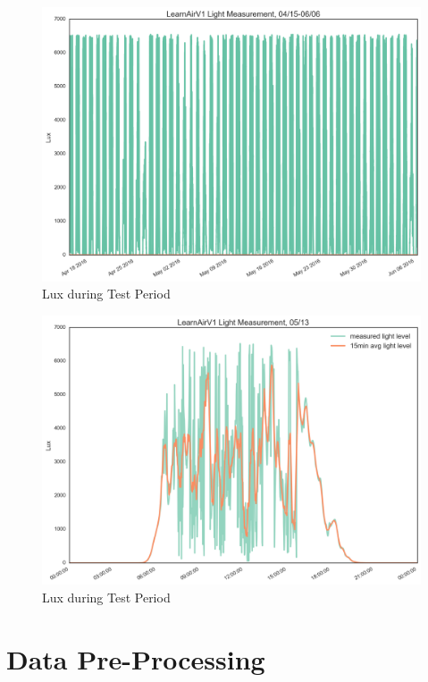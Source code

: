 \begin{figure}[htb]
 	\includegraphics[width=\textwidth]{figs/lux}               
 	 \caption{Lux during Test Period}
  	\label{fig:lux}
\end{figure}

\begin{figure}[htb]
 	\includegraphics[width=\textwidth]{figs/lux_zoomed}               
 	 \caption{Lux during Test Period}
  	\label{fig:lux_zoomed}
\end{figure}

\FloatBarrier
\section{Data Pre-Processing}
\FloatBarrier

